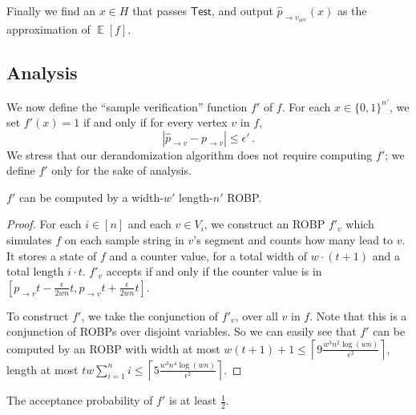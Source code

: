 \documentclass{toc}
\DeclareMathOperator*{\ExpVal}{\mathbb{E}}
\begin{document}
Finally we find an $x \in H$ that passes $\mathsf{Test}$, and output $\widehat{p}_{\rightarrow v_{\text{acc}}}(x)$ as the approximation of $\ExpVal[f]$.

\subsection{Analysis}

We now define the ``sample verification'' function $f'$ of $f$. For each $x \in \{0, 1\}^{n'}$, we set $f'(x) = 1$ if and only if for every vertex $v$ in $f$,
\begin{equation}
\label{ieq:prhoClose}
\left| \widehat{p}_{\to v} - p_{\to v} \right| \leq   \epsilon'\,. 
\end{equation}
We stress that our derandomization algorithm does not require computing $f'$; we define $f'$ only for the sake of analysis.

\begin{lemma} \label{lem:upgradeROBP}
$f'$ can be computed by a width-$w'$ length-$n'$ ROBP.
\end{lemma}

\begin{proof}
For each $i \in [n]$ and each $v \in V_i$, we construct an ROBP $f'_v$ which simulates $f$ on each sample string in $v$'s segment and counts how many lead to $v$. It stores a state of $f$ and a counter value, for a total width of $w \cdot (t + 1)$ and a total length $i \cdot t$. $f'_v$ accepts if and only if the counter value is in $[p_{\to v}t -\frac{\epsilon}{2wn}t , p_{\to v}t+ \frac{\epsilon}{2wn}t] $.

To construct $f'$, we take the conjunction of $f'_v$, over all $v$ in $f$. Note that this is a conjunction of ROBPs over disjoint variables. So we can easily see that $f'$ can be computed by an  ROBP with width at most $w (t+1) + 1 \leq \left \lceil 9\frac{w^3n^2 \log (wn) }{\epsilon^2} \right \rceil$, length at most $t w \sum_{i=1}^{n } i   \leq \left \lceil 5 \frac{w^3n^4  \log (wn) }{\epsilon^2} \right \rceil$.
\end{proof}

\begin{lemma} \label{lem:acceptProbofUpgradedROBP}
The acceptance probability of $f'$ is at least $\frac{1}{2}$.
\end{lemma}
\end{document}
